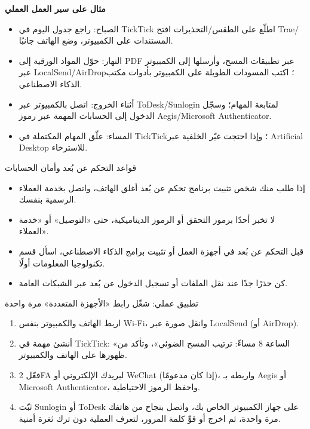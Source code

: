 
\textbf{مثال على سير العمل العملي}\par

\begin{itemize}
  \item الصباح: راجع جدول اليوم في TickTick اطلّع على الطقس/التحذيرات افتح Trae/المستندات على الكمبيوتر، وضع الهاتف جانبًا.
  \item النهار: حوّل المواد الورقية إلى PDF عبر تطبيقات المسح، وأرسلها إلى الكمبيوتر عبر LocalSend/AirDrop؛ اكتب المسودات الطويلة على الكمبيوتر بأدوات مكتب الذكاء الاصطناعي.
  \item أثناء الخروج: اتصل بالكمبيوتر عبر ToDesk/Sunlogin لمتابعة المهام؛ وسجّل الدخول إلى الحسابات المهمة عبر رموز Aegis/Microsoft Authenticator.
  \item المساء: علّق المهام المكتملة في TickTick؛ وإذا احتجت غيّر الخلفية عبر Artificial Desktop للاسترخاء.
\end{itemize}

\begin{tcbwarn}{قواعد التحكم عن بُعد وأمان الحسابات}
\begin{itemize}
  \item إذا طلب منك شخص تثبيت برنامج تحكم عن بُعد أغلق الهاتف، واتصل بخدمة العملاء الرسمية بنفسك.
  \item لا تخبر أحدًا برموز التحقق أو الرموز الديناميكية، حتى «التوصيل» أو «خدمة العملاء».
  \item قبل التحكم عن بُعد في أجهزة العمل أو تثبيت برامج الذكاء الاصطناعي، اسأل قسم تكنولوجيا المعلومات أولًا.
  \item كن حذرًا جدًا عند نقل الملفات أو تسجيل الدخول عن بُعد عبر الشبكات العامة.
\end{itemize}

\end{tcbwarn}

\begin{tcbpractice}{تطبيق عملي: شغّل رابط «الأجهزة المتعددة» مرة واحدة}
\begin{enumerate}
  \item اربط الهاتف والكمبيوتر بنفس Wi-Fi، وانقل صورة عبر LocalSend (أو AirDrop).
  \item أنشئ مهمة في TickTick: «الساعة 8 مساءً: ترتيب المسح الضوئي»، وتأكد من ظهورها على الهاتف والكمبيوتر.
  \item فعّل 2FA لبريدك الإلكتروني أو WeChat (إذا كان مدعومًا)، واربطه بـ Aegis أو Microsoft Authenticator، واحفظ الرموز الاحتياطية.
  \item ثبّت Sunlogin أو ToDesk على جهاز الكمبيوتر الخاص بك، واتصل بنجاح من هاتفك مرة واحدة، ثم اخرج أو قوِّ كلمة المرور، لتعرف العملية دون ترك ثغرة أمنية.
\end{enumerate}

\end{tcbpractice}

